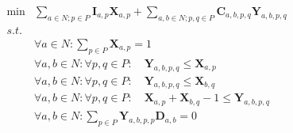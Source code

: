 \begin{align}
	\nonumber \min & \sum_{a \in N; p \in P} \mathbf{I}_{a,p}\mathbf{X}_{a,p} + \sum_{a,b \in N; p,q \in P} \mathbf{C}_{a,b,p,q}\mathbf{Y}_{a,b,p,q} \\
	\nonumber s.t. &  \\
	\nonumber & \forall a \in N : \sum_{p \in P}\mathbf{X}_{a,p} = 1 \\
	\nonumber & \forall a,b \in N : \forall p,q \in P : \quad \mathbf{Y}_{a,b,p,q} \leq \mathbf{X}_{a,p} \\
	\nonumber & \forall a,b \in N : \forall p,q \in P : \quad \mathbf{Y}_{a,b,p,q} \leq \mathbf{X}_{b,q} \\
	\nonumber & \forall a,b \in N : \forall p,q \in P : \quad \mathbf{X}_{a,p} + \mathbf{X}_{b,q} - 1 \leq \mathbf{Y}_{a,b,p,q} \\
	\nonumber & \forall a,b \in N : \sum_{p \in P}\mathbf{Y}_{a,b,p,p}\mathbf{D}_{a,b} = 0
\end{align}
